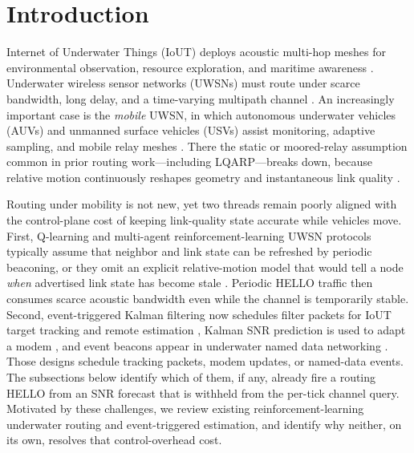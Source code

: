 \section{Introduction}
\label{sec:intro}
 Internet of Underwater Things (IoUT) deploys
acoustic multi-hop meshes for environmental observation, resource
exploration, and maritime awareness
\cite{gupta2024uwsn,gola2023taxonomy,saleem2024ai,jiang2023orsurvey}.
Underwater wireless sensor networks (UWSNs) must route under scarce
bandwidth, long delay, and a time-varying multipath channel
\cite{gupta2024uwsn,saleem2024ai,zhu2024trustcomst}.
An increasingly important case is the \emph{mobile} UWSN, in which
autonomous underwater vehicles (AUVs) and unmanned surface vehicles
(USVs) assist monitoring, adaptive sampling, and mobile relay meshes
\cite{gola2023taxonomy,wang2024lgdqn,liu2025mdqn,lu2025wper}.
There the static or moored-relay assumption common in prior routing
work---including LQARP---breaks down, because relative motion
continuously reshapes geometry and instantaneous link quality
\cite{liu2026lqarp,xu2025stgr}.

Routing under mobility is not new, yet two threads remain poorly
aligned with the control-plane cost of keeping link-quality state
accurate while vehicles move.
First, Q-learning and multi-agent reinforcement-learning UWSN
protocols typically assume that neighbor and link state can be
refreshed by periodic beaconing, or they omit an explicit
relative-motion model that would tell a node \emph{when} advertised
link state has become stale
\cite{nandyala2023qtar,zhang2025saqr,liu2024clorP,xu2025stgr,mohanraju2025adrp}.
Periodic HELLO traffic then consumes scarce acoustic bandwidth even
while the channel is temporarily stable.
Second, event-triggered Kalman filtering now schedules filter packets
for IoUT target tracking and remote estimation
\cite{li2026dse,priel2023consensus,sebastian2024eco,deng2023auto},
Kalman SNR prediction is used to adapt a modem
\cite{busacca2024snr}, and event beacons appear in underwater named
data networking \cite{wang2024push,li2024recar}.
Those designs schedule tracking packets, modem updates, or
named-data events.
The subsections below identify which of them, if any, already fire a
routing HELLO from an SNR forecast that is withheld from the
per-tick channel query.
Motivated by these challenges, we review existing
reinforcement-learning underwater routing and event-triggered
estimation, and identify why neither, on its own, resolves that
control-overhead cost.


